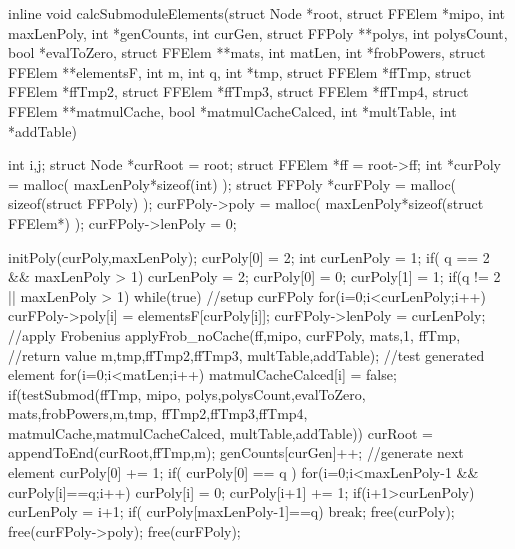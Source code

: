 \begin{ccode}[caption={Aus \url{../Sage/enumeratePCNs.c}},
  firstnumber=953, label=lst:calcSubmoduleElements]
inline void calcSubmoduleElements(struct Node *root,
        struct FFElem *mipo,
        int maxLenPoly, 
        int *genCounts, int curGen,
        struct FFPoly **polys, int polysCount, bool *evalToZero,
        struct FFElem **mats, int matLen, int *frobPowers,
        struct FFElem **elementsF,
        int m, int q, int *tmp,
        struct FFElem *ffTmp, struct FFElem *ffTmp2, struct FFElem *ffTmp3, 
        struct FFElem *ffTmp4,
        struct FFElem **matmulCache, bool *matmulCacheCalced,
        int *multTable, int *addTable){
    int i,j;
    struct Node *curRoot = root;
    struct FFElem *ff = root->ff;
    int *curPoly = malloc( maxLenPoly*sizeof(int) );
    struct FFPoly *curFPoly = malloc( sizeof(struct FFPoly) );
    curFPoly->poly = malloc( maxLenPoly*sizeof(struct FFElem*) );
    curFPoly->lenPoly = 0;

    initPoly(curPoly,maxLenPoly);
    curPoly[0] = 2;
    int curLenPoly = 1;
    if( q == 2 && maxLenPoly > 1){
        curLenPoly = 2;
        curPoly[0] = 0;
        curPoly[1] = 1;
    }
    if(q != 2 || maxLenPoly > 1){
        while(true){
            //setup curFPoly
            for(i=0;i<curLenPoly;i++)
                curFPoly->poly[i] = elementsF[curPoly[i]];
            curFPoly->lenPoly = curLenPoly;
            //apply Frobenius
            applyFrob_noCache(ff,mipo,
                    curFPoly,
                    mats,1, ffTmp, //return value
                    m,tmp,ffTmp2,ffTmp3,
                    multTable,addTable);
            //test generated element
            for(i=0;i<matLen;i++) matmulCacheCalced[i] = false;
            if(testSubmod(ffTmp, mipo,
                    polys,polysCount,evalToZero,
                    mats,frobPowers,m,tmp,
                    ffTmp2,ffTmp3,ffTmp4,
                    matmulCache,matmulCacheCalced, multTable,addTable)){
                curRoot = appendToEnd(curRoot,ffTmp,m);
                genCounts[curGen]++;
            }
            //generate next element
            curPoly[0] += 1;
            if( curPoly[0] == q ){
                for(i=0;i<maxLenPoly-1 && curPoly[i]==q;i++){
                    curPoly[i] = 0;
                    curPoly[i+1] += 1;
                }
                if(i+1>curLenPoly)
                    curLenPoly = i+1;
                if( curPoly[maxLenPoly-1]==q){
                    break;
                }
            }
        }
    }
    free(curPoly);
    free(curFPoly->poly);
    free(curFPoly);
}
\end{ccode}

